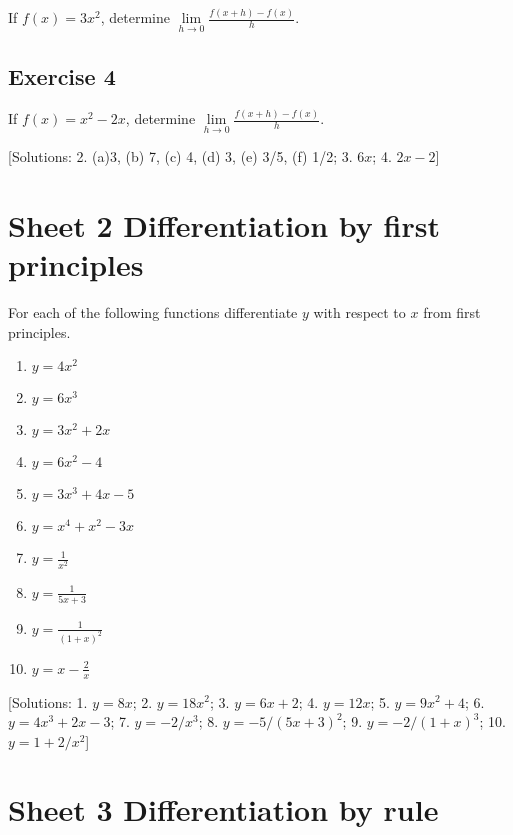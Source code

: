 \documentclass[
  english,
  11pt,
  oneside]{book}
\providecommand{\tightlist}{%
  \setlength{\itemsep}{0pt}\setlength{\parskip}{0pt}}
\newcommand{\slide}{}
\theoremstyle{definition}
\theoremstyle{definition}
\theoremstyle{definition}
\theoremstyle{definition}
\theoremstyle{remark}
\begin{document}
If \(f(x) = 3x^2\), determine \(\lim\limits_{h\to 0}\frac{f(x+h)-f(x)}{h}\).

\slide

\subsection*{Exercise 4}\label{exercise-4}

If \(f(x) = x^2-2x\), determine \(\lim\limits_{h\to 0}\frac{f(x+h)-f(x)}{h}\).
\slide

{[}Solutions: 2. (a)3, (b) 7, (c) 4, (d) 3, (e) 3/5, (f) 1/2; 3. \(6x\); 4. \(2x-2\){]}
\slide

\section{Sheet 2 Differentiation by first principles}\label{sheet-2-differentiation-by-first-principles}

For each of the following functions differentiate \(y\) with respect to \(x\) from first principles.

\begin{enumerate}
\def\labelenumi{\arabic{enumi}.}
\tightlist
\item
  \(y=4x^2\)
\item
  \(y=6x^3\)
\item
  \(y=3x^2+2x\)
\item
  \(y=6x^2-4\)
\item
  \(y=3x^3+4x-5\)
\item
  \(y=x^4+x^2-3x\)
\item
  \(y=\frac{1}{x^2}\)
\item
  \(y=\frac{1}{5x+3}\)
\item
  \(y=\frac{1}{(1+x)^2}\)
\item
  \(y=x-\frac{2}{x}\)
\end{enumerate}

\slide

{[}Solutions: 1. \(y=8x\); 2. \(y=18x^2\); 3. \(y=6x+2\); 4. \(y=12x\); 5. \(y=9x^2+4\); 6. \(y=4x^3+2x-3\); 7. \(y=-2/x^3\); 8. \(y=-5/(5x+3)^2\); 9. \(y=-2/(1+x)^3\); 10. \(y=1+2/x^2\){]}

\slide

\section{Sheet 3 Differentiation by rule}\label{sheet-3-differentiation-by-rule}
\end{document}
